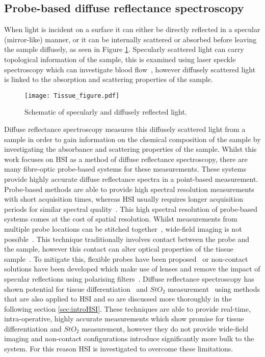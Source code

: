 \subsection{Probe-based diffuse reflectance spectroscopy}
When light is incident on a surface it can either be directly reflected in a specular (mirror-like) manner, or it can be internally scattered or absorbed before leaving the sample diffusely, as seen in Figure \ref{fig:diffuseR}. Specularly scattered light can carry topological information of the sample, this is examined using laser speckle spectroscopy which can investigate blood flow~\cite{Dunn2012}, however diffusely scattered light is linked to the absorption and scattering properties of the sample. 
\begin{figure}[h]
    \centering
    \texttt{[image: Tissue\_figure.pdf]}
    \caption{Schematic of specularly and diffusely reflected light.}
    \label{fig:diffuseR}
\end{figure}
Diffuse reflectance spectroscopy measures this diffusely scattered light from a sample in order to gain information on the chemical composition of the sample by investigating the absorbance and scattering properties of the sample. Whilst this work focuses on HSI as a method of diffuse reflectance spectroscopy, there are many fibre-optic probe-based systems for these measurements. These systems provide highly accurate diffuse reflectance spectra in a point-based measurement. Probe-based methods are able to provide high spectral resolution measurements with short acquisition times, whereas HSI usually requires longer acquisition periods for similar spectral quality~\cite{Dinish2017}. This high spectral resolution of probe-based systems comes at the cost of spatial resolution. Whilst measurements from multiple probe locations can be stitched together~\cite{Thrapp2020}, wide-field imaging is not possible~\cite{Nishidate2015}. This technique traditionally involves contact between the probe and the sample, however this contact can alter optical properties of the tissue sample~\cite{Miller2017}. To mitigate this, flexible probes have been proposed~\cite{Miller2017} or non-contact solutions have been developed which make use of lenses and remove the impact of specular reflections using polarising filters~\cite{Bish2011, Zhu2012}. %
Diffuse reflectance spectroscopy has shown potential for tissue differentiation~\cite{Skyrman2022} and $StO_2$ measurement~\cite{Fredriksson2020} using methods that are also applied to HSI and so are discussed more thoroughly in the following section \ref{sec:introHSI}. These techniques are able to provide real-time, intra-operative, highly accurate measurements which show promise for tissue differentiation and $StO_2$ measurement, however they do not provide wide-field imaging and non-contact configurations introduce significantly more bulk to the system. For this reason HSI is investigated to overcome these limitations. 

